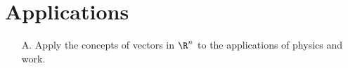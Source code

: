 \newpage
\section{Applications}

\begin{outcome}
\begin{enumerate}
\item[A.] Apply the concepts of vectors in $\R^n$ to the applications of physics and work.
\end{enumerate}
\end{outcome}